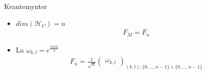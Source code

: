 \documentclass[norsk]{beamer}
\begin{document}
\begin{frame}{Kvantemynter}
\begin{itemize}
\begin{onlyenv}
\begin{itemize}
					\item $dim(\mathcal{H}_C)=n$
					\begin{align*}
						F_M = F_n
					\end{align*}
					\item La $\omega_{k,l}=e^{\frac{2\pi ikl}{n}}$
					\begin{align*}
						F_n = \frac{1}{\sqrt{n}} \begin{pmatrix*}
							\omega_{k,l}
						\end{pmatrix*}_{(k,l):\{0,...,n-1\}\times\{0,...,n-1\}}
					\end{align*}
				\end{itemize}
			\end{onlyenv}
		\end{itemize}
	\end{frame}
\end{document}
